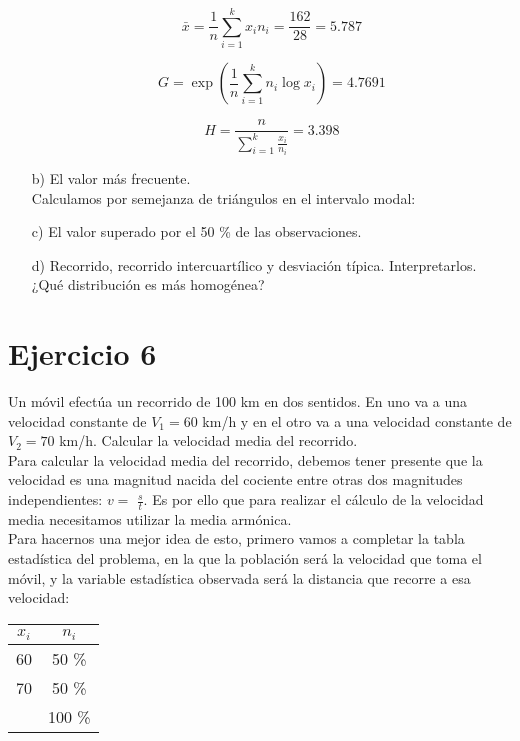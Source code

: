 \documentclass[a4paper,12pt]{article}
\begin{document}
\begin{itemize}
    $$\bar x = \frac {1}{n} \sum\limits_{i = 1}^k {x_i n_i} = \frac{162}{28} = 5.787 $$

    $$G = \exp\left(\frac{1}{n} \sum\limits_{i = 1}^k n_i \log x_i\right) = 4.7691$$

    $$H = \frac{n}{\sum\limits_{i = 1}^k \frac{x_i}{n_i}} = 3.398$$
    
    \item[b)] El valor más frecuente.\\
    Calculamos por semejanza de triángulos en el intervalo modal:
    
    
    \item[c)] El valor superado por el 50 \% de las observaciones.
    \item[d)] Recorrido, recorrido intercuartílico y desviación típica. Interpretarlos. ¿Qué distribución es más homogénea?
\end{itemize}

\section*{Ejercicio 6}
Un móvil efectúa un recorrido de 100 km en dos sentidos. En uno va a una velocidad constante de $V_1=60$ km/h y en el otro va a una velocidad constante de $V_2=70$ km/h. Calcular la velocidad media del recorrido. \\

Para calcular la velocidad media del recorrido, debemos tener presente que la velocidad es una magnitud nacida del cociente entre otras dos magnitudes independientes: $v =$ $\frac{s}{t}$. Es por ello que para realizar el cálculo de la velocidad media necesitamos utilizar la media armónica.\\
Para hacernos una mejor idea de esto, primero vamos a completar la tabla estadística del problema, en la que la población será la velocidad que toma el móvil, y la variable estadística observada será la distancia que recorre a esa velocidad: \\

\begin {center}
    \begin{tabular}{|c|c|}
            \hline
            $x_i$ & $n_i$ \\
            \hline
            60 & 50 \% \\
            70 & 50 \% \\
            \hline
            & 100 \% \\
            \hline
    \end{tabular}
\end {center}
\end{document}
